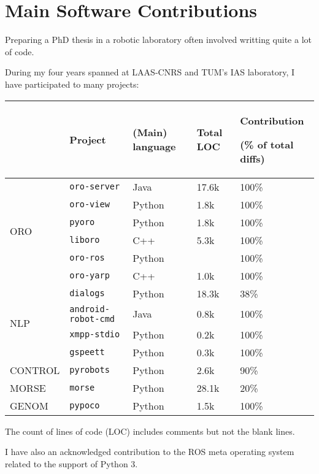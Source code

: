 \chapter{Main Software Contributions}
\label{chapt|software-contrib}

Preparing a PhD thesis in a robotic laboratory often involved writting quite a
lot of code.

During my four years spanned at LAAS-CNRS and TUM's IAS laboratory, I have
participated to many projects:

\begin{center}

\begin{tabular}{llllp{4cm}}
\toprule
 & {\bf Project} & (Main) language & Total LOC & Contribution \par (\% of total diffs) \\
\midrule

\multirow{6}{1cm}{ORO} & {\tt oro-server} & Java & 17.6k & 100\% \\
 & {\tt oro-view} & Python & 1.8k & 100\% \\
 & {\tt pyoro} & Python & 1.8k & 100\% \\
 & {\tt liboro} & C++ & 5.3k & 100\% \\
 & {\tt oro-ros} & Python & & 100\% \\
 & {\tt oro-yarp} & C++ & 1.0k & 100\% \\
\midrule
\multirow{4}{1cm}{NLP} & {\tt dialogs} & Python & 18.3k & 38\% \\
 & {\tt android-robot-cmd} & Java & 0.8k & 100\% \\
 & {\tt xmpp-stdio} & Python & 0.2k & 100\% \\
 & {\tt gspeett} & Python & 0.3k & 100\% \\
\midrule
CONTROL & {\tt pyrobots} & Python & 2.6k & 90\% \\
\midrule
MORSE & {\tt morse} & Python & 28.1k & 20\% \\
\midrule
GENOM & {\tt pypoco} & Python & 1.5k & 100\% \\
\bottomrule

\end{tabular}
\end{center}


The count of lines of code (LOC) includes comments but not the blank lines.

I have also an acknowledged contribution to the ROS meta operating system
related to the support of Python 3.

